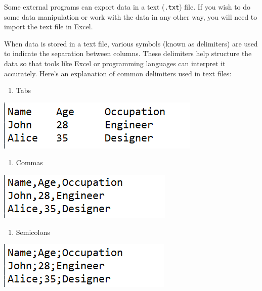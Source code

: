 \documentclass[
]{book}
\providecommand{\tightlist}{%
  \setlength{\itemsep}{0pt}\setlength{\parskip}{0pt}}
\begin{document}
Some external programs can export data in a text (\texttt{.txt}) file. If you wish to do some data manipulation or work with the data in any other way, you will need to import the text file in Excel.

When data is stored in a text file, various symbols (known as delimiters) are used to indicate the separation between columns. These delimiters help structure the data so that tools like Excel or programming languages can interpret it accurately. Here's an explanation of common delimiters used in text files:

\newpage

\begin{enumerate}
\def\labelenumi{\arabic{enumi}.}
\tightlist
\item
  Tabs
\end{enumerate}

\begin{center}\includegraphics[width=0.4\linewidth]{Figures/import_tabs} \end{center}

\begin{enumerate}
\def\labelenumi{\arabic{enumi}.}
\setcounter{enumi}{1}
\tightlist
\item
  Commas
\end{enumerate}

\begin{center}\includegraphics[width=0.4\linewidth]{Figures/import_commas} \end{center}

\begin{enumerate}
\def\labelenumi{\arabic{enumi}.}
\setcounter{enumi}{2}
\tightlist
\item
  Semicolons
\end{enumerate}

\begin{center}\includegraphics[width=0.4\linewidth]{Figures/import_semicolon} \end{center}
\end{document}

